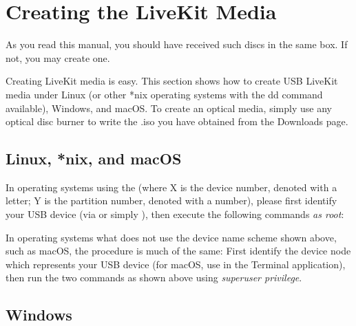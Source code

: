     \section{Creating the LiveKit Media}
    
    As you read this manual, you should have received such discs in the same box.
    If not, you may create one.

    Creating LiveKit media is easy. This section shows how to create USB LiveKit media under Linux
    (or other *nix operating systems with the dd command available), Windows, and macOS.
    To create an optical media, simply use any optical disc burner to write the .iso you have obtained from the Downloads page.

    \subsection{Linux, *nix, and macOS}

    In operating systems using the  (where X is the device number, denoted with a letter;
    Y is the partition number, denoted with a number), please first identify your USB device (via  or simply ),
    then execute the following commands \textit{as root}:



    In operating systems what does not use the device name scheme shown above,
    such as macOS, the procedure is much of the same:
    First identify the device node which represents your USB device
    (for macOS, use  in the Terminal application),
    then run the two commands as shown above using \textit{superuser privilege}.

    \subsection{Windows}

